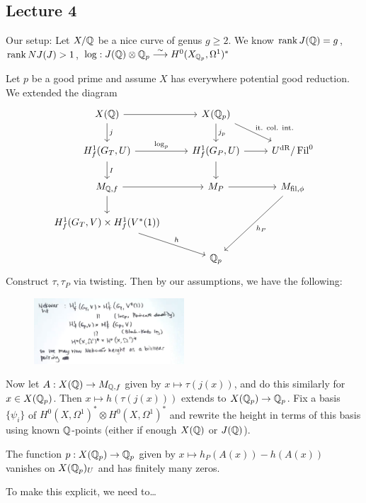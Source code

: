\newpage
\subsection{Lecture 4}

Our setup: Let $X/\mathbb{Q}$ be a nice curve of genus $g \geq 2$. We know $\operatorname{rank} J(\mathbb{Q})= g$, $\operatorname{rank} NJ(J)>1$, $\log: J(\mathbb{Q}) \otimes \mathbb{Q}_p \stackrel{\sim}{\longrightarrow} H^0(X_{\mathbb{Q}_p},\Omega^1)^*$


Let $p$ be a good prime and assume $X$ has everywhere potential good reduction. We extended the diagram
	\[
	\begin{tikzcd}
	X(\Q) \arrow{d}{j} \arrow{r} & X(\Qp) \arrow{dr}{\text{it. col. int.}} \arrow{d}{j_p} \\
	H_f^1(G_T,U) \arrow{r}{\log_p} \arrow{d}{I} &  H_f^1(G_P,U) \arrow{r} \arrow{d} & U^\dr/\Fil^0 \\
	M_{\Q,f} \arrow{r} \arrow{d} & M_P \arrow{r} & M_{\text{fil},\phi} \arrow{ddl}{h_P} \\
	H_f^1(G_T,V) \times H_f^1(V^*(1)) \arrow{dr}{h} & & \\
	& \Q_p & 
	\end{tikzcd}
	\]
Construct $\tau,\tau_P$ via twisting. Then by our assumptions, we have the following:


	\begin{figure}[!ht]
	\centering
	\includegraphics[width=0.5\textwidth]{../images/im46.png}
	\end{figure}


Now let $A: X(\mathbb{Q}) \to M_{\mathbb{Q},f}$ given by $x \mapsto \tau(j(x))$, and do this similarly for $x \in X(\mathbb{Q}_p)$. Then $x \mapsto h(\tau(j(x)))$ extends to $X(\mathbb{Q}_p) \to \mathbb{Q}_p$. Fix a basis $\{\psi_i\}$ of $H^0(X,\Omega^1)^* \otimes H^0(X,\Omega^1)^*$ and rewrite the height in terms of this basis using known $\mathbb{Q}$-points (either if enough $X(\mathbb{Q})$ or $J(\mathbb{Q})$). 


\begin{thm}[B-Degara]
The function $p: X(\mathbb{Q}_p) \to \mathbb{Q}_p$ given by $x \mapsto h_P(A(x)) - h(A(x))$ vanishes on $X(\mathbb{Q}_p)_U$ and has finitely many zeros.
\end{thm}

To make this explicit, we need to\dots

